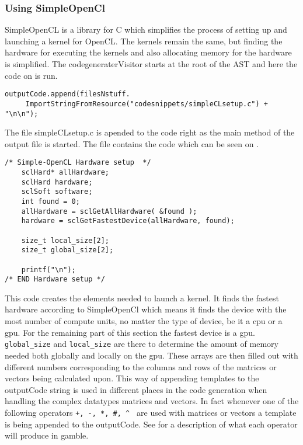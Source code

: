 \subsubsection*{Using SimpleOpenCl}
SimpleOpenCL is a library for C which simplifies the process of setting up and launching a kernel for OpenCL.
The kernels remain the same, but finding the hardware for executing the kernels and also allocating memory for the hardware is simplified.
The codegeneraterVisitor starts at the root of the AST and here the code on  is run.

\begin{lstlisting}[caption=Call to setup SimpleOpenCL in the compiler,numbers=none,frame=tlrb,label={lst:OpenCLSetup}]
outputCode.append(filesNstuff.
	 ImportStringFromResource("codesnippets/simpleCLsetup.c") + "\n\n");
\end{lstlisting}

The file simpleCLsetup.c is apended to the code right as the main method of the output file is started.
The file contains the code which can be seen on .

\begin{lstlisting}[caption=SimpleOpenCL setup in the compiler,numbers=none,frame=tlrb,label={lst:OpenCLSetup2}]
/* Simple-OpenCL Hardware setup  */
	sclHard* allHardware;
	sclHard hardware;
	sclSoft software;
	int found = 0;
	allHardware = sclGetAllHardware( &found );
	hardware = sclGetFastestDevice(allHardware, found);

    size_t local_size[2];
    size_t global_size[2];

    printf("\n");
/* END Hardware setup */
\end{lstlisting}

This code creates the elements needed to launch a kernel.
It finds the fastest hardware according to SimpleOpenCl which means it finds the device with the most number of compute units, no matter the type of device, be it a \acrshort{cpu} or a \acrshort{gpu}.
For the remaining part of this section the fastest device is a \acrshort{gpu}.
\texttt{global\_size} and \texttt{local\_size} are there to determine the amount of memory needed both globally and locally on the \acrshort{gpu}.
These arrays are then filled out with different numbers corresponding to the columns and rows of the matrices or vectors being calculated upon.
This way of appending templates to the outputCode string is used in different places in the code generation when handling the complex datatypes matrices and vectors.
In fact whenever one of the following operators \texttt{+, -, *, \#, \^{} } are used with matrices or vectors a template is being appended to the outputCode.
See  for a description of what each operator will produce in \gls{gamble}.

